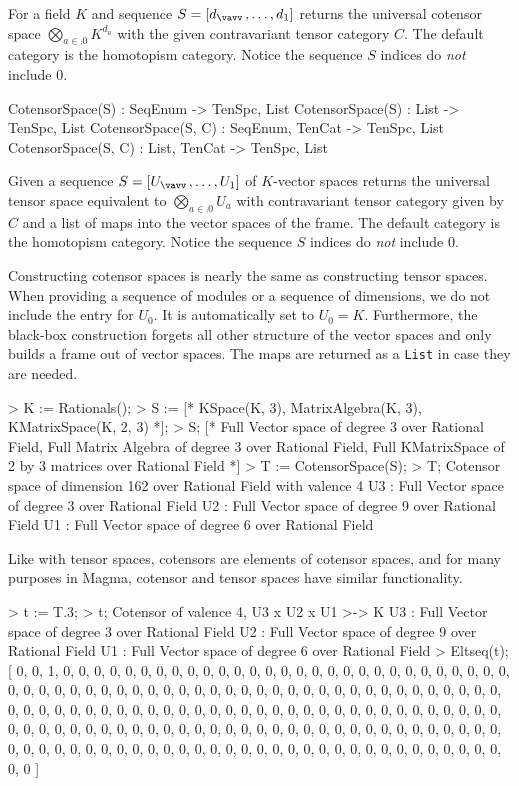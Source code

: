 For a field $K$ and sequence $S=[d_{\vav},\dots, d_1]$ returns the universal cotensor 
space $\bigotimes_{a\in\comp{0}}K^{d_a}$ with the given contravariant tensor category $C$.
The default category is the homotopism category.
Notice the sequence $S$ indices do \emph{not} include 0.

\begin{intrinsics}
CotensorSpace(S) : SeqEnum -> TenSpc, List
CotensorSpace(S) : List -> TenSpc, List
CotensorSpace(S, C) : SeqEnum, TenCat -> TenSpc, List
CotensorSpace(S, C) : List, TenCat -> TenSpc, List
\end{intrinsics}

Given a sequence $S=[U_{\vav},\dots, U_1]$ of $K$-vector spaces returns the universal tensor 
space equivalent to $\bigotimes_{a\in\comp{0}}U_a$ with contravariant tensor 
category given by $C$ and a list of maps into the vector spaces of the frame. 
The default category is the homotopism category.
Notice the sequence $S$ indices do \emph{not} include 0.

\begin{example}[UniversalCoTenSpc]

Constructing cotensor spaces is nearly the same as constructing tensor spaces. 
When providing a sequence of modules or a sequence of dimensions, we do not include the entry for $U_0$. 
It is automatically set to $U_0=K$.
Furthermore, the black-box construction forgets all other structure of the vector spaces and only builds a frame out of vector spaces. 
The maps are returned as a \texttt{List} in case they are needed.
\begin{code}
> K := Rationals();
> S := [* KSpace(K, 3), MatrixAlgebra(K, 3), KMatrixSpace(K, 2, 3) *];
> S;
[*
    Full Vector space of degree 3 over Rational Field,
    Full Matrix Algebra of degree 3 over Rational Field,
    Full KMatrixSpace of 2 by 3 matrices over Rational Field
*]
> T := CotensorSpace(S);
> T;
Cotensor space of dimension 162 over Rational Field with valence 4
U3 : Full Vector space of degree 3 over Rational Field
U2 : Full Vector space of degree 9 over Rational Field
U1 : Full Vector space of degree 6 over Rational Field
\end{code}

Like with tensor spaces, cotensors are elements of cotensor spaces, and for many purposes in Magma, cotensor and tensor spaces have similar functionality. 
\begin{code}
> t := T.3;
> t;
Cotensor of valence 4, U3 x U2 x U1 >-> K
U3 : Full Vector space of degree 3 over Rational Field
U2 : Full Vector space of degree 9 over Rational Field
U1 : Full Vector space of degree 6 over Rational Field
> Eltseq(t);
[ 0, 0, 1, 0, 0, 0, 0, 0, 0, 0, 0, 0, 0, 0, 0, 0, 0, 0, 0, 0, 0, 0, 0, 0, 0,
0, 0, 0, 0, 0, 0, 0, 0, 0, 0, 0, 0, 0, 0, 0, 0, 0, 0, 0, 0, 0, 0, 0, 0, 0, 0,
0, 0, 0, 0, 0, 0, 0, 0, 0, 0, 0, 0, 0, 0, 0, 0, 0, 0, 0, 0, 0, 0, 0, 0, 0, 0,
0, 0, 0, 0, 0, 0, 0, 0, 0, 0, 0, 0, 0, 0, 0, 0, 0, 0, 0, 0, 0, 0, 0, 0, 0, 0,
0, 0, 0, 0, 0, 0, 0, 0, 0, 0, 0, 0, 0, 0, 0, 0, 0, 0, 0, 0, 0, 0, 0, 0, 0, 0,
0, 0, 0, 0, 0, 0, 0, 0, 0, 0, 0, 0, 0, 0, 0, 0, 0, 0, 0, 0, 0, 0, 0, 0, 0, 0,
0, 0, 0, 0, 0, 0, 0 ]
\end{code}
\end{example}

